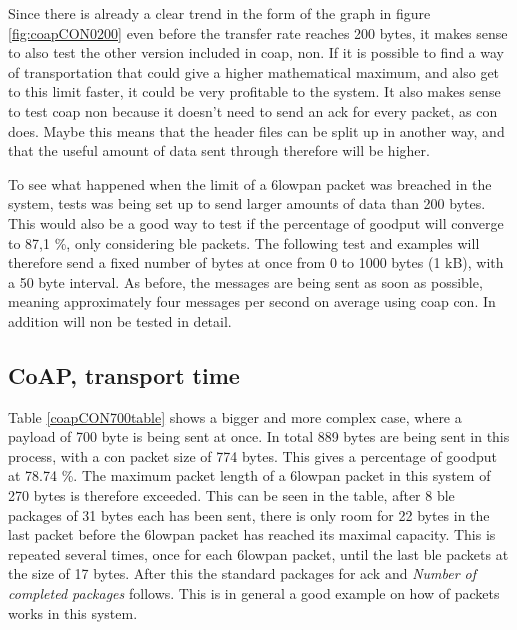 \noindent Since there is already a clear trend in the form of the graph in figure \ref{fig:coapCON0200} even before the transfer rate reaches 200 bytes, it makes sense to also test the other version included in \gls{coap}, \gls{non}. If it is possible to find a way of transportation that could give a higher mathematical maximum, and also get to this limit faster, it could be very profitable to the system. It also makes sense to test \gls{coap} \gls{non} because it doesn’t need to send an \gls{ack} for every packet, as \gls{con} does. Maybe this means that the header files can be split up in another way, and that the useful amount of data sent through therefore will be higher. 


\noindent To see what happened when the limit of a \gls{6lowpan} packet was breached in the system, tests was being set up to send larger amounts of data than 200 bytes. This would also be a good way to test if the percentage of goodput will converge to 87,1 \%, only considering \gls{ble} packets. The following test and examples will therefore send a fixed number of bytes at once from 0 to 1000 bytes (1 kB), with a 50 byte interval. As before, the messages are being sent as soon as possible, meaning approximately four messages per second on average using \gls{coap} \gls{con}. In addition will \gls{non} be tested in detail. 


\subsection{CoAP, transport time}

\noindent Table \ref{coapCON700table} shows a bigger and more complex case, where a payload of 700 byte is being sent at once. In total 889 bytes are being sent in this process, with a \gls{con} packet size of 774 bytes. This gives a percentage of goodput at 78.74 \%. The maximum packet length of a \gls{6lowpan} packet in this system of 270 bytes is therefore exceeded. This can be seen in the table, after 8 \gls{ble} packages of 31 bytes each has been sent, there is only room for 22 bytes in the last packet before the \gls{6lowpan} packet has reached its maximal capacity. This is repeated several times, once for each \gls{6lowpan} packet, until the last \gls{ble} packets at the size of 17 bytes. After this the standard packages for \gls{ack} and \textit{Number of completed packages} follows. This is in general a good example on how of packets works in this system. 



